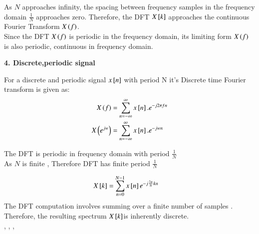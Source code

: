 \documentclass[journal,12pt,onecolumn]{IEEEtran}
\theoremstyle{remark}
\begin{document}
As  $N$ approaches infinity, the spacing between frequency samples in the frequency domain  $\frac{1}{N}$  approaches zero. Therefore, the DFT $X{}\left[k\right]$ approaches the continuous Fourier Transform $X\left(f\right)$. \\

Since the DFT $X\left(f\right)$  is periodic in the frequency domain, its limiting form $X\left(f\right)$ is also periodic, continuous in frequency domain.

\vspace{2mm}
\textbf{4. Discrete,periodic signal}

For a discrete and periodic signal  $x{}\left[n\right]$ with period N it's Discrete time Fourier transform is given as: 
\begin{align}
X\left(f\right)&= \sum_{n=-\infty}^{\infty} x{}\left[n\right].e^{-j2\pi fn}\\
X\left(e^{jw}\right)&= \sum_{n=-\infty}^{\infty} x{}\left[n\right].e^{-jwn}
\end{align}

The DFT is periodic in frequency domain with period $\frac{1}{N}$\\

As $N$ is finite , Therefore DFT has finite period $\frac{1}{N}$

\begin{align}
X{}\left[k\right]&=\sum_{n=0}^{N-1}x{}\left[n\right]e^{-j\frac{2\pi}{N}kn}
\end{align}
The DFT computation involves summing over a finite number of samples . Therefore, the resulting spectrum  $X{}\left[k\right]$is inherently discrete.\\

 \textrightarrow {}   ,   \textrightarrow {}   ,    \textrightarrow {}   ,    \textrightarrow {}
\end{document}

